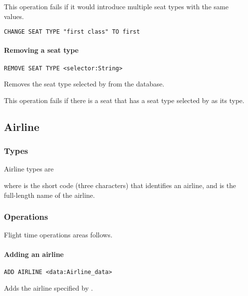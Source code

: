 This operation fails if it would introduce multiple seat types with the same
values.

\begin{texa}
  \begin{lstlisting}
CHANGE SEAT TYPE "first class" TO first
  \end{lstlisting}
\end{texa}

\paragraph{Removing a seat type}
\begin{operation}
  \lstinline{REMOVE SEAT TYPE <selector:String>}
\end{operation}
Removes the seat type selected by  from the database.

This operation fails if there is a seat that has a seat type selected by
 as its type.

\subsection{Airline}
\subsubsection{Types}
Airline types are
\begin{description}
  \item[] 
  \item[] 
\end{description}
where  is the short code (three characters) that identifies an
airline, and  is the full-length name of the airline.

\subsubsection{Operations}
Flight time operations areas follows.

\paragraph{Adding an airline}
\begin{operation}
  \lstinline{ADD AIRLINE <data:Airline_data>}
\end{operation}
Adds the airline specified by .

